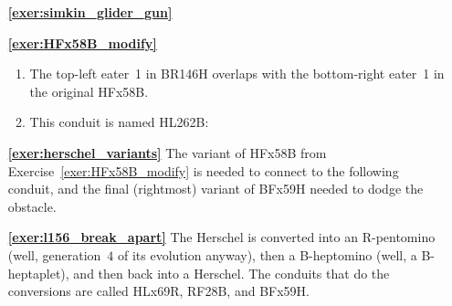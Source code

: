\begin{multicols}{2}
\begin{itemize}[leftmargin=0em]
\begin{enumerate}[leftmargin=1.5em,label=\bf\color{ocre}(\alph*)]
			\item {} \\
			
			\item {} \\
		\end{enumerate}
	
		\item[\bf\color{ocre}\sffamily\ref{exer:simkin_glider_gun}]  \\
	

		\item[\bf\color{ocre}\sffamily\ref{exer:HFx58B_modify}] \begin{enumerate}[leftmargin=1.5em,label=\bf\color{ocre}(\alph*)]
			\item The top-left eater~1 in BR146H overlaps with the bottom-right eater~1 in the original HFx58B.
			
			\item This conduit is named HL262B:
			\begin{center}
			\end{center}
		\end{enumerate}
	
	
		\item[\bf\color{ocre}\sffamily\ref{exer:herschel_variants}] The variant of HFx58B from Exercise~\ref{exer:HFx58B_modify} is needed to connect to the following conduit, and the final (rightmost) variant of BFx59H needed to dodge the obstacle.
		\begin{center}
		\end{center}
	
	
		\item[\bf\color{ocre}\sffamily\ref{exer:l156_break_apart}] The Herschel is converted into an R-pentomino (well, generation~$4$ of its evolution anyway), then a B-heptomino (well, a B-heptaplet), and then back into a Herschel. The conduits that do the conversions are called HLx69R, RF28B, and BFx59H.
	\end{itemize}
\end{multicols}



\hypertarget{solutions_glider_guns}{}\label{solutions_glider_guns}
